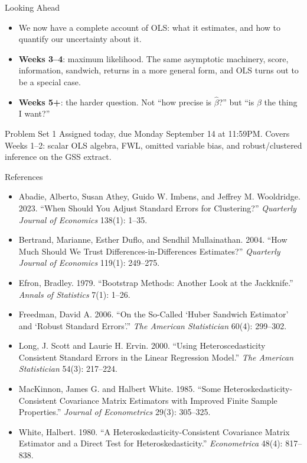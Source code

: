 \documentclass[aspectratio=169,11pt,xcolor=dvipsnames]{beamer}
\begin{document}
\begin{frame}{Looking Ahead}
\begin{itemize}\itemsep5pt
  \item We now have a complete account of OLS: what it estimates, and how to
        quantify our uncertainty about it.
  \item \textbf{Weeks 3--4}: maximum likelihood. The same asymptotic machinery, 
        score, information, sandwich, returns in a more general form, and OLS
        turns out to be a special case.
  \item \textbf{Weeks 5+}: the harder question. Not ``how precise is
        $\hat\beta$?'' but ``is $\beta$ the thing I want?''
\end{itemize}
\vskip6pt
\begin{block}{Problem Set 1}
Assigned today, due Monday September 14 at 11:59PM. Covers Weeks 1--2: scalar OLS
algebra, FWL, omitted variable bias, and robust/clustered inference on the GSS
extract.
\end{block}
\end{frame}

\begin{frame}[allowframebreaks,t]{References}
\scriptsize
\begin{itemize}\item Abadie, Alberto, Susan Athey, Guido W. Imbens, and Jeffrey M. Wooldridge.
2023. ``When Should You Adjust Standard Errors for Clustering?''
\textit{Quarterly Journal of Economics} 138(1): 1--35.
\item Bertrand, Marianne, Esther Duflo, and Sendhil Mullainathan. 2004. ``How Much
Should We Trust Differences-in-Differences Estimates?''
\textit{Quarterly Journal of Economics} 119(1): 249--275.
\item Efron, Bradley. 1979. ``Bootstrap Methods: Another Look at the Jackknife.''
\textit{Annals of Statistics} 7(1): 1--26.
\item Freedman, David A. 2006. ``On the So-Called `Huber Sandwich Estimator' and
`Robust Standard Errors'.'' \textit{The American Statistician} 60(4): 299--302.
\item Long, J. Scott and Laurie H. Ervin. 2000. ``Using Heteroscedasticity
Consistent Standard Errors in the Linear Regression Model.''
\textit{The American Statistician} 54(3): 217--224.
\item MacKinnon, James G. and Halbert White. 1985. ``Some
Heteroskedasticity-Consistent Covariance Matrix Estimators with Improved Finite
Sample Properties.'' \textit{Journal of Econometrics} 29(3): 305--325.
\item White, Halbert. 1980. ``A Heteroskedasticity-Consistent Covariance Matrix
Estimator and a Direct Test for Heteroskedasticity.''
\textit{Econometrica} 48(4): 817--838.
\end{itemize}
\end{frame}
\end{document}
